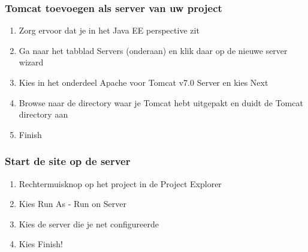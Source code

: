 \documentclass{beamer}
\begin{document}
\begin{frame}

\frametitle{Tomcat toevoegen als server van uw project}

\begin{enumerate}
  \item Zorg ervoor dat je in het Java EE perspective zit
  \item Ga naar het tabblad Servers (onderaan) en klik daar op de nieuwe server wizard
  \item Kies in het onderdeel Apache voor Tomcat v7.0 Server en kies Next
  \item Browse naar de directory waar je Tomcat hebt uitgepakt en duidt de Tomcat directory aan
  \item Finish
\end{enumerate}

\end{frame}


\begin{frame}

\frametitle{Start de site op de server}

\begin{enumerate}
  \item Rechtermuisknop op het project in de Project Explorer
  \item Kies Run As - Run on Server
  \item Kies de server die je net configureerde
  \item Kies Finish!
\end{enumerate}

\end{frame}
\end{document}
